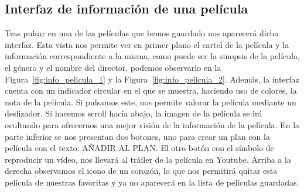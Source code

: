 \subsection{Interfaz de información de una película}
\label{makereference3.4.5}

Tras pulsar en una de las películas que hemos guardado nos aparecerá dicha interfaz. 
Esta vista nos permite ver en primer plano el cartel de la película y la información correspondiente a la misma, como puede
ser la sinopsis de la película, el género y el nombre del director, podemos observarlo en la Figura~\ref{fig:info_pelicula_1} y la Figura~\ref{fig:info_pelicula_2}. Además, la interfaz cuenta con un indicador circular en el que 
se muestra, haciendo uso de colores, la nota de la película. Si pulsamos este, nos permite
valorar la película mediante un deslizador.
Si hacemos scroll hacia abajo, la imagen de la película se irá ocultando para ofrecernos una mejor visión de la información de la película.
En la parte inferior se nos presentan dos botones, uno para crear un plan con la película con el texto: AÑADIR AL PLAN. El otro botón con el símbolo de reproducir un vídeo, nos llevará al tráiler de la película en Youtube.
Arriba a la derecha observamos el icono de un corazón, lo que nos permitirá quitar esta película de nuestras favoritas y ya no aparecerá en la
lista de películas guardadas.

